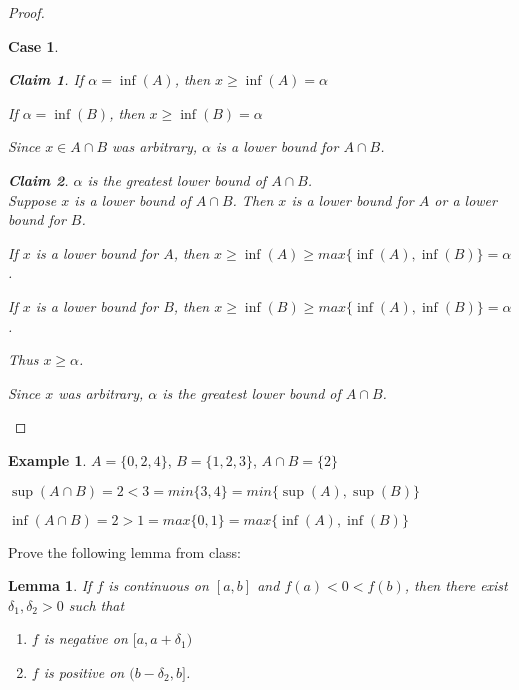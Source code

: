 \documentclass{article} %
\theoremstyle{plain}
\newtheorem*{lemma*}{Lemma}
\newtheorem*{claim*}{Claim}
\newtheorem{case}{Case}
\theoremstyle{definition}
\newtheorem*{example*}{Example}
\begin{document}
\begin{proof}
\begin{case}
\begin{adjustwidth}{2em}{0pt}
\begin{claim*}
                If $\alpha = \inf(A)$, then $x \geq \inf(A) = \alpha$

                If $\alpha = \inf(B)$, then $x \geq \inf(B) = \alpha$

                Since $x \in A \cap B$ was arbitrary, $\alpha$ is a lower bound for $A \cap B$.
            \end{claim*}
            \begin{claim*} $\alpha$ is the greatest lower bound of $A \cap B$. \\
                Suppose $x$ is a lower bound of $A \cap B$. Then $x$ is a lower bound for $A$ or a lower bound for $B$.

                If $x$ is a lower bound for $A$, then $x \geq \inf(A) \geq max\{\inf(A), \inf(B)\} = \alpha$.

                If $x$ is a lower bound for $B$, then $x \geq \inf(B) \geq max\{\inf(A), \inf(B)\} = \alpha$.

                Thus $x \geq \alpha$.

                Since $x$ was arbitrary, $\alpha$ is the greatest lower bound of $A \cap B$.
            \end{claim*}
        \end{adjustwidth}

    \end{case}

\end{proof} 

\begin{example*} $A = \{0,2,4\}$, $B = \{1,2,3\}$, $A \cap B = \{2\}$

    $\sup(A \cap B) = 2 < 3 = min\{3,4\} = min\{\sup(A), \sup(B) \}$

    $\inf(A \cap B) = 2 > 1 = max\{0,1\} = max\{\inf(A), \inf(B) \}$

\end{example*}



\noindent{} Prove the following lemma from class:

\begin{lemma*} If $f$ is continuous on $[a,b]$ and $f(a) < 0 < f(b)$, then there exist $\delta_1, \delta_2 > 0$ such that 
\begin{enumerate}
\item $f$ is negative on $[a,a+\delta_1)$
\item $f$ is positive on $(b-\delta_2, b]$.
\end{enumerate}
\end{lemma*}
\end{document}
